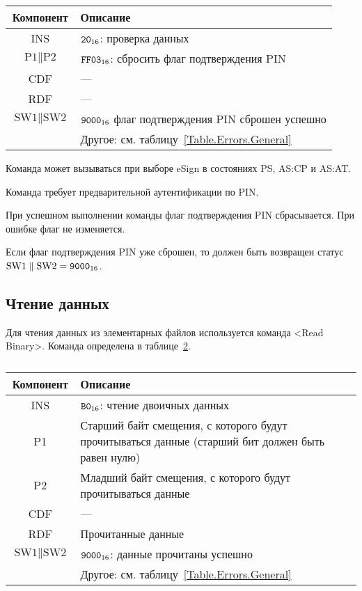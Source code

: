 \begin{table}[hbt]
\caption{}\label{Table.Oper.VerifyDeauthCmd}
\begin{tabular}{|c|p{14cm}|}
\hline
Компонент & Описание \\
\hline
\hline
INS & $\texttt{20}_{16}$: проверка данных\\
\hline
$\text{P1} \parallel \text{P2}$ & $\texttt{FF03}_{16}$: сбросить 
флаг подтверждения PIN\\
\hline
CDF & ---  \\
\hline 
\hline
RDF &  --- \\
\hline
$\text{SW1} \parallel \text{SW2}$ & $\texttt{9000}_{16}$ 
флаг подтверждения PIN сброшен успешно\\
\cline{2-2}
& Другое: см. таблицу~\ref{Table.Errors.General} \\
\hline
\end{tabular}
\end{table}

Команда может вызываться при выборе eSign в состояниях PS, AS:CP и AS:AT.

Команда требует предварительной аутентификации по PIN.

При успешном выполнении команды флаг подтверждения PIN
сбрасывается. При ошибке флаг не изменяется.

Если флаг подтверждения PIN уже сброшен, то должен быть возвращен статус
$\text{SW1} \parallel \text{SW2} = \texttt{9000}_{16}$.

\subsection{Чтение данных}
\label{Oper.Descr.Read}

Для чтения данных из элементарных файлов используется команда <Read Binary>.
Команда определена в таблице~\ref{Table.Oper.ReadCmd}.

\begin{table}[hbt]
\caption{}\label{Table.Oper.ReadCmd}
\begin{tabular}{|c|p{14cm}|}
\hline
Компонент & Описание \\
\hline
\hline
INS & $\texttt{B0}_{16}$: чтение двоичных данных \\
\hline
P1 & Старший байт смещения, с которого будут прочитываться данные 
(старший бит должен быть равен нулю)\\
\hline
P2 & Младший байт смещения, с которого будут прочитываться данные\\
\hline
CDF &  --- \\
\hline 
\hline
RDF & 	Прочитанные данные \\
\hline
$\text{SW1} \parallel\text{SW2}$ & 
$\texttt{9000}_{16}$: данные прочитаны успешно \\
\cline{2-2}
& Другое: см. таблицу~\ref{Table.Errors.General} \\
\hline
\end{tabular}
\end{table}

